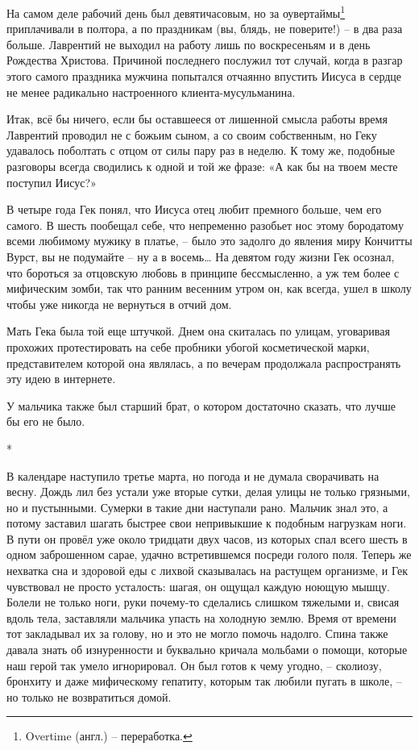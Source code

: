 \documentclass[
  a5paperpaper,
  DIV=11,
  numbers=noendperiod]{scrreprt}
\begin{document}
На самом деле рабочий день был девятичасовым, но за
оувертаймы\footnote{Overtime (англ.) -- переработка.} приплачивали в
полтора, а по праздникам (вы, блядь, не поверите!) -- в два раза больше.
Лаврентий не выходил на работу лишь по воскресеньям и в день Рождества
Христова. Причиной последнего послужил тот случай, когда в разгар этого
самого праздника мужчина попытался отчаянно впустить Иисуса в сердце не
менее радикально настроенного клиента-мусульманина.

Итак, всё бы ничего, если бы оставшееся от лишенной смысла работы время
Лаврентий проводил не с божьим сыном, а со своим собственным, но Геку
удавалось поболтать с отцом от силы пару раз в неделю. К тому же,
подобные разговоры всегда сводились к одной и той же фразе: «А как бы на
твоем месте поступил Иисус?»

В четыре года Гек понял, что Иисуса отец любит премного больше, чем его
самого. В шесть пообещал себе, что непременно разобьет нос этому
бородатому всеми любимому мужику в платье, -- было это задолго до
явления миру Кончитты Вурст, вы не подумайте -- ну а в восемь\ldots{} На
девятом году жизни Гек осознал, что бороться за отцовскую любовь в
принципе бессмысленно, а уж тем более с мифическим зомби, так что ранним
весенним утром он, как всегда, ушел в школу чтобы уже никогда не
вернуться в отчий дом.

Мать Гека была той еще штучкой. Днем она скиталась по улицам, уговаривая
прохожих протестировать на себе пробники убогой косметической марки,
представителем которой она являлась, а по вечерам продолжала
распространять эту идею в интернете.

У мальчика также был старший брат, о котором достаточно сказать, что
лучше бы его не было.

*

В календаре наступило третье марта, но погода и не думала сворачивать на
весну. Дождь лил без устали уже вторые сутки, делая улицы не только
грязными, но и пустынными. Сумерки в такие дни наступали рано. Мальчик
знал это, а потому заставил шагать быстрее свои непривыкшие к подобным
нагрузкам ноги. В пути он провёл уже около тридцати двух часов, из
которых спал всего шесть в одном заброшенном сарае, удачно встретившемся
посреди голого поля. Теперь же нехватка сна и здоровой еды с лихвой
сказывалась на растущем организме, и Гек чувствовал не просто усталость:
шагая, он ощущал каждую ноющую мышцу. Болели не только ноги, руки
почему-то сделались слишком тяжелыми и, свисая вдоль тела, заставляли
мальчика упасть на холодную землю. Время от времени тот закладывал их за
голову, но и это не могло помочь надолго. Спина также давала знать об
изнуренности и буквально кричала мольбами о помощи, которые наш герой
так умело игнорировал. Он был готов к чему угодно, -- сколиозу, бронхиту
и даже мифическому гепатиту, которым так любили пугать в школе, -- но
только не возвратиться домой.
\end{document}
